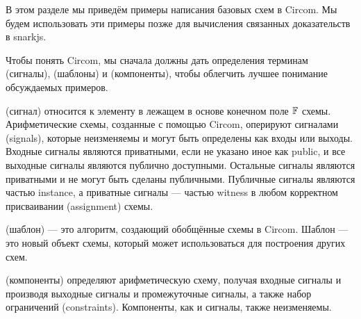 В этом разделе мы приведём примеры написания базовых схем в Circom. Мы будем использовать эти примеры позже для вычисления связанных доказательств в snarkjs.

Чтобы понять Circom, мы сначала должны дать определения терминам  (сигналы),  (шаблоны) и  (компоненты), чтобы облегчить лучшее понимание обсуждаемых примеров.

 (сигнал) относится к элементу в лежащем в основе конечном поле $\mathbb{F}$ схемы. Арифметические схемы, созданные с помощью Circom, оперируют сигналами (signals), которые неизменяемы и могут быть определены как входы или выходы. Входные сигналы являются приватными, если не указано иное как public, и все выходные сигналы являются публично доступными. Остальные сигналы являются приватными и не могут быть сделаны публичными. Публичные сигналы являются частью instance, а приватные сигналы --- частью witness в любом корректном присваивании (assignment) схемы.

 (шаблон) --- это алгоритм, создающий обобщённые схемы в Circom. Шаблон --- это новый объект схемы, который может использоваться для построения других схем.

 (компоненты) определяют арифметическую схему, получая входные сигналы и производя выходные сигналы и промежуточные сигналы, а также набор ограничений (constraints). Компоненты, как и сигналы, также неизменяемы.

